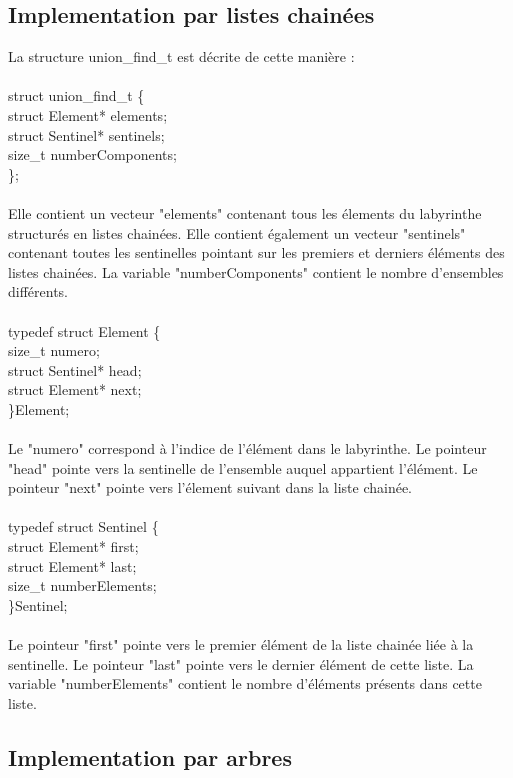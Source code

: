 \documentclass[11pt]{article}
\begin{document}
\subsection{Implementation par listes chainées}
La structure union\_find\_t est décrite de cette manière : \\ \\
struct union\_find\_t \{ \\
    struct Element* elements; \\
    struct Sentinel* sentinels; \\
    size\_t numberComponents; \\
\}; \\ \\
Elle contient un vecteur "elements" contenant tous les élements du labyrinthe structurés en listes chainées. Elle contient également un vecteur "sentinels" contenant toutes les sentinelles pointant sur les premiers et derniers éléments des listes chainées. La variable "numberComponents" contient le nombre d'ensembles différents. \\ \\
typedef struct Element \{\\
    size\_t numero;\\
    struct Sentinel* head;\\
    struct Element* next;\\
\}Element;\\ \\
Le "numero" correspond à l'indice de l'élément dans le labyrinthe. Le pointeur "head" pointe vers la sentinelle de l'ensemble auquel appartient l'élément. Le pointeur "next" pointe vers l'élement suivant dans la liste chainée.\\
\\
typedef struct Sentinel \{ \\
    struct Element* first; \\
    struct Element* last; \\
    size\_t numberElements; \\
\}Sentinel;\\ \\
Le pointeur "first" pointe vers le premier élément de la liste chainée liée à la sentinelle. Le pointeur "last" pointe vers le dernier élément de cette liste. La variable "numberElements" contient le nombre d'éléments présents dans cette liste.
\subsection{Implementation par arbres}
\end{document}
